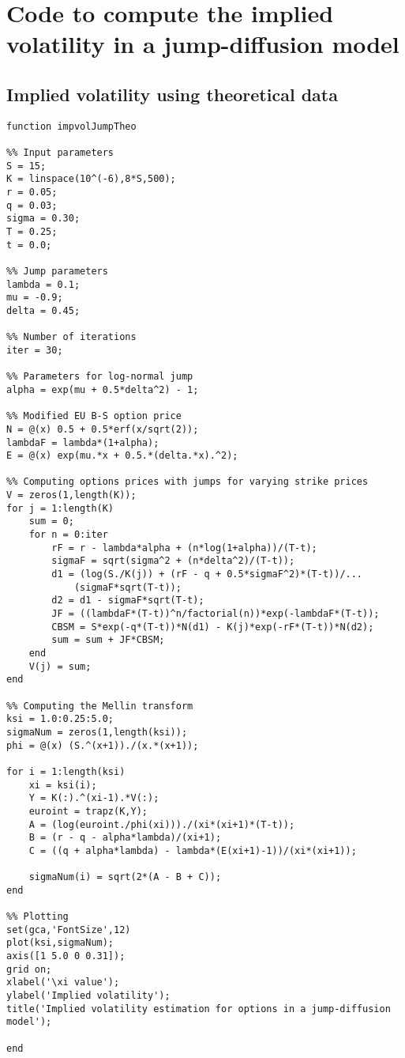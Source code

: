 \section{Code to compute the implied volatility in a jump-diffusion model}
\subsection{Implied volatility using theoretical data}

\begin{lstlisting}
function impvolJumpTheo

%% Input parameters
S = 15;
K = linspace(10^(-6),8*S,500);
r = 0.05;
q = 0.03;
sigma = 0.30;
T = 0.25;
t = 0.0;

%% Jump parameters
lambda = 0.1;
mu = -0.9;
delta = 0.45;

%% Number of iterations
iter = 30;

%% Parameters for log-normal jump
alpha = exp(mu + 0.5*delta^2) - 1;

%% Modified EU B-S option price
N = @(x) 0.5 + 0.5*erf(x/sqrt(2));
lambdaF = lambda*(1+alpha);
E = @(x) exp(mu.*x + 0.5.*(delta.*x).^2);

%% Computing options prices with jumps for varying strike prices
V = zeros(1,length(K));
for j = 1:length(K)
    sum = 0;
    for n = 0:iter
        rF = r - lambda*alpha + (n*log(1+alpha))/(T-t);
        sigmaF = sqrt(sigma^2 + (n*delta^2)/(T-t));
        d1 = (log(S./K(j)) + (rF - q + 0.5*sigmaF^2)*(T-t))/...
            (sigmaF*sqrt(T-t));
        d2 = d1 - sigmaF*sqrt(T-t);
        JF = ((lambdaF*(T-t))^n/factorial(n))*exp(-lambdaF*(T-t));
        CBSM = S*exp(-q*(T-t))*N(d1) - K(j)*exp(-rF*(T-t))*N(d2);
        sum = sum + JF*CBSM;
    end
    V(j) = sum;
end

%% Computing the Mellin transform
ksi = 1.0:0.25:5.0;
sigmaNum = zeros(1,length(ksi));
phi = @(x) (S.^(x+1))./(x.*(x+1));

for i = 1:length(ksi)
    xi = ksi(i);
    Y = K(:).^(xi-1).*V(:);
    euroint = trapz(K,Y);
    A = (log(euroint./phi(xi)))./(xi*(xi+1)*(T-t));
    B = (r - q - alpha*lambda)/(xi+1);
    C = ((q + alpha*lambda) - lambda*(E(xi+1)-1))/(xi*(xi+1));
    
    sigmaNum(i) = sqrt(2*(A - B + C));
end

%% Plotting
set(gca,'FontSize',12)
plot(ksi,sigmaNum);
axis([1 5.0 0 0.31]);
grid on;
xlabel('\xi value');
ylabel('Implied volatility');
title('Implied volatility estimation for options in a jump-diffusion model');

end

\end{lstlisting}

